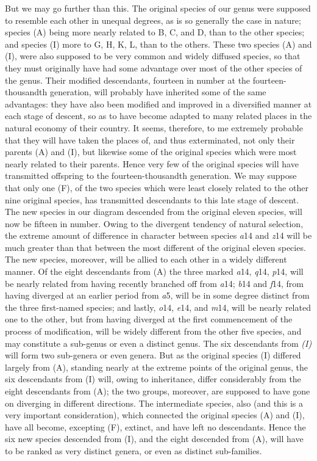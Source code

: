\indent But we may go further than this. The original species of our genus were supposed to resemble each other in unequal degrees, as is so generally the case in nature; species (A) being more nearly related to B, C, and D, than to the other species; and species (I) more to G, H, K, L, than to the others. These two species (A) and (I), were also supposed to be very common and widely diffused species, so that they must originally have had some advantage over most of the other species of the genus. Their modified descendants, fourteen in number at the fourteen-thousandth generation, will probably have inherited some of the same advantages: they have also been modified and improved in a diversified manner at each stage of descent, so as to have become adapted to many related places in the natural economy of their country. It seems, therefore, to me extremely probable that they will have taken the places of, and thus exterminated, not only their parents (A) and (I), but likewise some of the original species which were most nearly related to their parents.  Hence very few of the original species will have transmitted offspring to the fourteen-thousandth generation. We may suppose that only one (F), of the two species which were least closely related to the other nine original species, has transmitted descendants to this late stage of descent. \\
\indent The new species in our diagram descended from the original eleven species, will now be fifteen in number.  Owing to the divergent tendency of natural selection, the extreme amount of difference in character between species \emph{a}14 and \emph{z}14 will be much greater than that between the most different of the original eleven species. The new species, moreover, will be allied to each other in a widely different manner. Of the eight descendants from (A) the three marked \emph{a}14, \emph{q}14, \emph{p}14, will be nearly related from having recently branched off from \emph{a}14; \emph{b}14 and \emph{f}14, from having diverged at an earlier period from \emph{a}5, will be in some degree distinct from the three first-named species; and lastly, \emph{o}14, \emph{e}14, and \emph{m}14, will be nearly related one to the other, but from having diverged at the first commencement of the process of modification, will be widely different from the other five species, and may constitute a sub-genus or even a distinct genus.  The six descendants from \emph{(I)} will form two sub-genera or even genera. But as the original species (I) differed largely from (A), standing nearly at the extreme points of the original genus, the six descendants from (I) will, owing to inheritance, differ considerably from the eight descendants from (A); the two groups, moreover, are supposed to have gone on diverging in different directions. The intermediate species, also (and this is a very important consideration), which connected the original species (A) and (I), have all become, excepting (F), extinct, and have left no descendants.  Hence the six new species descended from (I), and the eight descended from (A), will have to be ranked as very distinct genera, or even as distinct sub-families. \\
